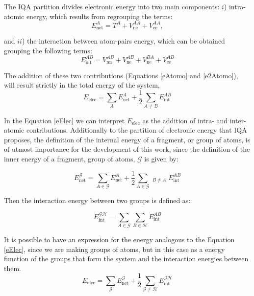 The IQA partition
divides electronic energy into two main components:
$i$) intra-atomic energy, which
results from regrouping the terms:
%
\begin{equation} \label{eAtomo}
E^A_{\mathrm{net}} = T^A + V_{\mathrm{ne}}^{AA} + V_{\mathrm{ee}}^{AA},
\end{equation}

\noindent and $ii$) the interaction between atom-pairs energy, which can be obtained
grouping the following terms:
\begin{equation} \label{e2Atomo}
E^{AB}_{\mathrm{int}} = V_{\mathrm{nn}}^{AB} + V_{\mathrm{ne}}^{AB}
+ V_{\mathrm{ne}}^{BA} + V_{\mathrm{ee}}^{AB}
\end{equation}

The addition of these two contributions (Equations \ref{eAtomo} and \ref{e2Atomo}), will
result strictly in the total energy of the system,
%
\begin{equation} \label{eElec}
E_{\mathrm{elec}} = 
  \sum_A E^A_{\mathrm{net}} + \frac{1}{2} \sum_{A \neq B} E_{\mathrm{int}}^{AB}
\end{equation}

In the Equation \ref{eElec} we can interpret $E_{\mathrm{elec}}$ as the
addition of
intra- and inter-atomic contributions.
Additionally to the
partition of electronic energy that IQA proposes, the definition of the
internal energy of a fragment, or group of atoms, is of utmost importance for
the development of this work, since the definition of the inner energy of a
fragment, group of atoms, $\mathscr{G}$ is given by:

\begin{equation} \label{eG}
E^{\mathscr{G}}_{\mathrm{net}} = \sum_{A \in \mathscr{G}} E^A_{\mathrm{net}} 
	       +\frac{1}{2} \sum_{A\in \mathscr{G}}
		\mathop{\sum_{B \in \mathscr{G}}}_{B \neq A} E_{\mathrm{int}}^{AB}
\end{equation}

\noindent Then the interaction energy between two groups is defined as:

\begin{equation} \label{energiaGH}
E^{\mathscr{GH}}_{\mathrm{int}} = \sum_{A \in \mathscr{G}} \sum_{B \in
		 \mathscr{H}} E_{\mathrm{int}}^{AB}
\end{equation}

It is possible to have an expression for the energy analogous
to the Equation \ref{eElec}, since
we are making groups of atoms,
but in this case as a energy function of the groups that
form the system and the interaction energies between
them.
%
\begin{equation} \label{energiaGrupos}
E_{\mathrm{elec}} = \sum_{\mathscr{G}} E^{\mathscr{G}}_{\mathrm{net}} 
+\frac{1}{2} \sum_{\mathscr{G} \neq \mathscr{H}} E_{\mathrm{int}}^{\mathscr{GH}}
\end{equation}

